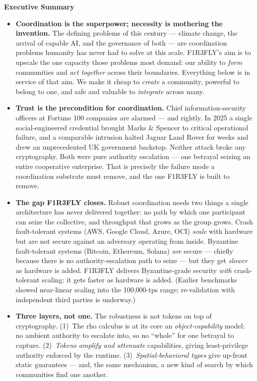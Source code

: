 \documentclass[11pt]{article}
\begin{document}
\vspace{1.2em}

\begin{keybox}
\textbf{Executive Summary}
\begin{itemize}[leftmargin=1.2em, itemsep=4pt, topsep=4pt]
  \item \textbf{Coordination is the superpower; necessity is mothering the invention.} The defining problems of this century --- climate change, the arrival of capable AI, and the governance of both --- are coordination problems humanity has never had to solve at this scale. F1R3FLY's aim is to upscale the one capacity those problems most demand: our ability to \emph{form} communities and \emph{act together} across their boundaries. Everything below is in service of that aim. We make it cheap to \emph{create} a community, powerful to belong to one, and safe and valuable to \emph{integrate} across many.
  \item \textbf{Trust is the precondition for coordination.} Chief information-security officers at Fortune 100 companies are alarmed --- and rightly. In 2025 a single social-engineered credential brought Marks \& Spencer to critical operational failure, and a comparable intrusion halted Jaguar Land Rover for weeks and drew an unprecedented UK government backstop. Neither attack broke any cryptography. Both were pure authority escalation --- one betrayal seizing an entire cooperative enterprise. That is precisely the failure mode a coordination substrate must remove, and the one F1R3FLY is built to remove.
  \item \textbf{The gap F1R3FLY closes.} Robust coordination needs two things a single architecture has never delivered together: no path by which one participant can seize the collective, and throughput that grows as the group grows. Crash fault-tolerant systems (AWS, Google Cloud, Azure, OCI) \emph{scale} with hardware but are not secure against an adversary operating from inside. Byzantine fault-tolerant systems (Bitcoin, Ethereum, Solana) \emph{are} secure --- chiefly because there is no authority-escalation path to seize --- but they get \emph{slower} as hardware is added. F1R3FLY delivers Byzantine-grade security \emph{with} crash-tolerant scaling: it gets faster as hardware is added. (Earlier benchmarks showed near-linear scaling into the 100{,}000-tps range; re-validation with independent third parties is underway.)
  \item \textbf{Three layers, not one.} The robustness is not tokens on top of cryptography. (1)~The rho calculus is at its core an \emph{object-capability} model: no ambient authority to escalate into, so no ``whole'' for one betrayal to capture. (2)~\emph{Tokens amplify and attenuate} capabilities, giving least-privilege authority enforced by the runtime. (3)~\emph{Spatial-behavioral types} give up-front static guarantees --- and, the same mechanism, a new kind of search by which communities find one another.

\end{itemize}
\end{keybox}
\end{document}
